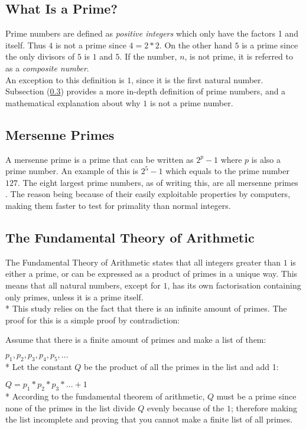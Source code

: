 \documentclass[main.tex]{subfiles}
\begin{document}
\subsection{What Is a Prime?}
Prime numbers are defined as \textit{positive integers} which only have the
factors 1 and itself. Thus $4$ is not a prime since $4 = 2 * 2$. On the other
hand $5$ is a prime since the only divisors of $5$ is $1$ and $5$. If the
number, $n$, is not prime, it is referred to as a \textit{composite number}. \\

An exception to this definition is $1$, since it is the first natural number.
Subsection (\ref{arithmetic}) provides a more in-depth definition of prime
numbers, and a mathematical explanation about why $1$ is not a prime number.

\subsection{Mersenne Primes}
A mersenne prime is a prime that can be written as $2^{p}-1$ where $p$ is also a
prime number. An example of this is $2^5-1$ which equals to the prime number
$127$. The eight largest prime numbers, as of writing this, are all mersenne primes
\cite{prime:largest_digits}. The reason being because of their easily
exploitable properties by computers, making them faster to test for primality than
normal integers.

\subsection{The Fundamental Theory of Arithmetic} \label{arithmetic} The
Fundamental Theory of Arithmetic \cite{theorem:arithmetic} states that all
integers greater than $1$ is either a prime, or can be expressed as a product of
primes in a unique way. This means that all natural numbers, except for $1$, has
its own factorisation containing only primes, unless it is a prime itself.
\newline
\\*
This study relies on the fact that there is an infinite amount of primes. The
proof for this is a simple proof by contradiction:

\begin{mdframed}
  Assume that there is a finite amount of primes and make a list of them:

  $p_1, p_2, p_3, p_4, p_5, ...$ \newline
  \\*
  Let the constant $Q$ be the product of all the primes in the list and add 1:

  $Q = p_1 * p_2 * p_3 * ... + 1$ \newline
  \\*
  According to the fundamental theorem of arithmetic, $Q$ must be a prime since
  none of the primes in the list divide $Q$ evenly because of the $1$; therefore
  making the list incomplete and proving that you cannot make a finite list of
  all primes.
\end{mdframed}
\end{document}
